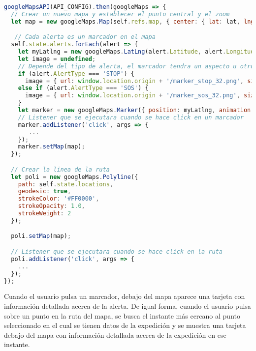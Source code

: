 \begin{lstlisting}[language=javascript,captionpos=t,caption={\textbf{Creación del mapa en la plataforma \textit{web}, incluyendo la ruta y los marcadores de alertas}.},label={lst:googlemapsweb}]
googleMapsAPI(API_CONFIG).then(googleMaps => {
  // Crear un nuevo mapa y establecer el punto central y el zoom
  let map = new googleMaps.Map(self.refs.map, { center: { lat: lat, lng: lng }, zoom: 16 });

   // Cada alerta es un marcador en el mapa
  self.state.alerts.forEach(alert => {
    let myLatlng = new googleMaps.LatLng(alert.Latitude, alert.Longitude);
    let image = undefined;
    // Depende del tipo de alerta, el marcador tendra un aspecto u otro
    if (alert.AlertType === 'STOP') {
      image = { url: window.location.origin + '/marker_stop_32.png', size: new googleMaps.Size(32, 64), origin: new googleMaps.Point(0, 0) }
    else if (alert.AlertType === 'SOS') {
      image = { url: window.location.origin + '/marker_sos_32.png', size: new googleMaps.Size(32, 64), origin: new googleMaps.Point(0, 0) }
    }
    let marker = new googleMaps.Marker({ position: myLatlng, animation: googleMaps.Animation.DROP, title: 'Alerta', icon: image });
    // Listener que se ejecutara cuando se hace click en un marcador
    marker.addListener('click', args => {
       ...
    });
    marker.setMap(map);
  });

  // Crear la linea de la ruta
  let poli = new googleMaps.Polyline({
    path: self.state.locations,
    geodesic: true,
    strokeColor: '#FF0000',
    strokeOpacity: 1.0,
    strokeWeight: 2
  });

  poli.setMap(map);

  // Listener que se ejecutara cuando se hace click en la ruta
  poli.addListener('click', args => {
    ...
  });
});
\end{lstlisting}

Cuando el usuario pulsa un marcador, debajo del mapa aparece una tarjeta con información detallada acerca de la alerta. De igual forma, cuando el usuario pulsa sobre un punto en la ruta del mapa, se busca el instante más cercano al punto seleccionado en el cual se tienen datos de la expedición y se muestra una tarjeta debajo del mapa con información detallada acerca de la expedición en ese instante. 

